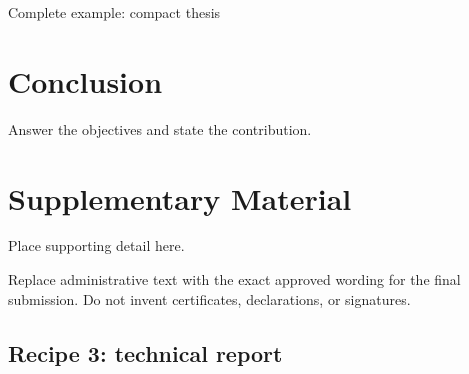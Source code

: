 \begin{latexcode}{Complete example: compact thesis}
\chapter{Conclusion}
Answer the objectives and state the contribution.

\appendix
\chapter{Supplementary Material}
Place supporting detail here.


\end{latexcode}

Replace administrative text with the exact approved wording for the final
submission. Do not invent certificates, declarations, or signatures.

\section{Recipe 3: technical report}

